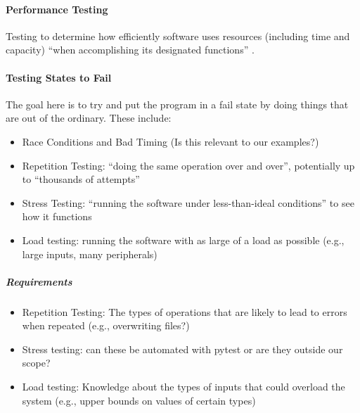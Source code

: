\paragraph{Performance Testing}

Testing to determine how efficiently software uses resources (including time
and capacity) ``when accomplishing its designated functions''
. 



\paragraph{Testing States to Fail \citep[pp.~84-87]{Patton2006}}

The goal here is to try and put the program in a fail state by doing things
that are out of the ordinary. These include:

\begin{itemize}
      \item Race Conditions and Bad Timing \citep[pp.~85-86]{Patton2006}
            (Is this relevant to our examples?)
      \item Repetition Testing: ``doing the same operation over and over'',
            potentially up to ``thousands of attempts''
            \citep[p.~86]{Patton2006}
      \item Stress Testing: ``running the software under less-than-ideal
            conditions'' to see how it functions \citep[p.~86]{Patton2006}
      \item Load testing: running the software with as large of a load as
            possible (e.g., large inputs, many peripherals)
            \citep[p.~86]{Patton2006}
\end{itemize}

\subparagraph{Requirements}
\begin{itemize}
      \item Repetition Testing: The types of operations that are likely to lead
            to errors when repeated (e.g., overwriting files?)
      \item Stress testing: can these be automated with pytest or are they
            outside our scope? 
      \item Load testing: Knowledge about the types of inputs that could
            overload the system (e.g., upper bounds on values of certain types)
\end{itemize}

